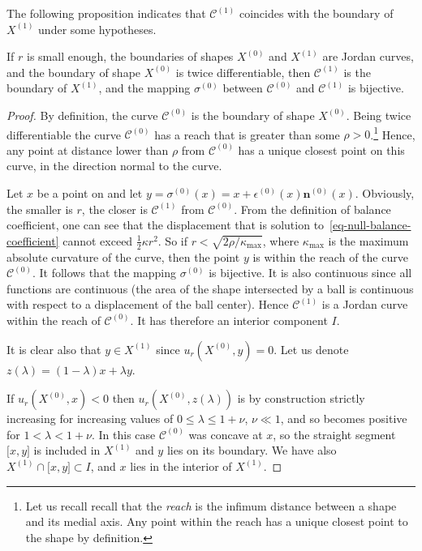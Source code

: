 \documentclass[review]{siamart220329}
\newcommand{\C}{\mathcal{C}} %
\begin{document}
The following proposition indicates that $\C^{(1)}$ coincides with
the boundary of $X^{(1)}$ under some hypotheses.

\begin{proposition} \label{prop-C-equ-X}
  If $r$ is small enough, the boundaries of shapes $X^{(0)}$ and
  $X^{(1)}$ are Jordan curves, and the boundary of shape $X^{(0)}$ is
  twice differentiable, then $\C^{(1)}$ is the boundary of $X^{(1)}$,
  and the mapping $\sigma^{(0)}$ between $\C^{(0)}$ and $\C^{(1)}$ is
  bijective.
\end{proposition}
\begin{proof}
  By definition, the curve $\C^{(0)}$ is the boundary of shape
  $X^{(0)}$.  Being twice differentiable the curve $\C^{(0)}$ has a
  reach that is greater than some $\rho > 0$.\footnote{Let us recall
  recall that the {\em reach} is the infimum distance between a shape
  and its medial axis. Any point within the reach has a unique closest
  point to the shape by definition.} Hence, any point at distance lower than $\rho$
  from $\C^{(0)}$ has a unique closest point on this curve, in the
  direction normal to the curve.

  Let $x$ be a point on \replaced[id=daniel]{$\C^{(0)}$}{$\C^{(1)}$} and let
  $y=\sigma^{(0)}(x)=x+\epsilon^{(0)}(x) \mathbf{n}^{(0)}(x)$.
  Obviously, the smaller is $r$, the closer is $\C^{(1)}$ from
  $\C^{(0)}$.  From the definition of balance coefficient, one can see
  that the displacement that is solution to~\cref{eq-null-balance-coefficient} cannot exceed $\frac{1}{2}\kappa
  r^2$. So if $r < \sqrt{2\rho / \kappa_{\max}}$, where
  $\kappa_{\max}$ is the maximum absolute curvature of the curve, then
  the point $y$ is within the reach of the curve $\C^{(0)}$. It follows
  that the mapping $\sigma^{(0)}$ is bijective. It is also continuous
  since all functions are continuous (the area of the shape
  intersected by a ball is continuous with respect to a displacement
  of the ball center).  Hence $\C^{(1)}$ is a Jordan curve within the
  reach of $\C^{(0)}$. It has therefore an interior component $I$.

  It is clear also that $y \in X^{(1)}$ since $u_r(X^{(0)},y)=0$.
  Let us denote $z(\lambda)=(1-\lambda)x+\lambda y$.

  If $u_r(X^{(0)},x)<0$ then $u_r(X^{(0)},z(\lambda))$ is by
  construction strictly increasing for increasing values of $0 \le
  \lambda \le 1+\nu$, $\nu \ll 1$, and so becomes positive for
  $1<\lambda < 1 + \nu$. In this case $\C^{(0)}$ was concave at $x$,
  so the straight segment $\lbrack x,y \rbrack$ is included in
  $X^{(1)}$ and $y$ lies on its boundary. We have also $X^{(1)}
  \cap \lbrack x,y \rbrack \subset I$, and $x$ lies in the interior of
  $X^{(1)}$.
  

\end{proof}
\end{document}
